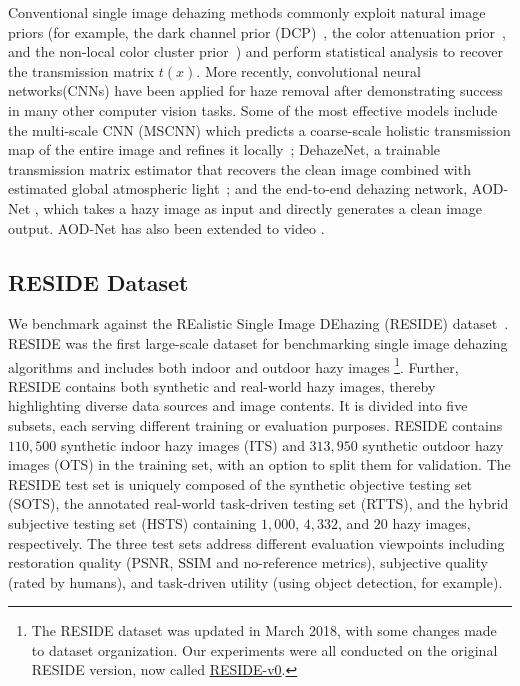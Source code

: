 \documentclass[10pt,twocolumn,letterpaper]{article}
\begin{document}
Conventional single image dehazing methods commonly exploit natural image priors (for example, the dark channel prior (DCP)~\cite{he2011single,tang2014investigating}, the color attenuation prior~\cite{zhu2015fast}, and the non-local color cluster prior~\cite{berman2016non}) and perform statistical analysis to recover the transmission matrix $t(x)$. More recently, convolutional neural networks(CNNs) have been applied for haze removal after demonstrating success in many other computer vision tasks. Some of the most effective models include the multi-scale CNN (MSCNN) which predicts a coarse-scale holistic transmission map of the entire image and refines it locally~\cite{ren2016single}; DehazeNet, a trainable transmission matrix estimator that recovers the clean image combined with estimated global atmospheric light~\cite{cai2016dehazenet}; and the end-to-end dehazing network, AOD-Net \cite{li2017aod,li2017all}, which takes a hazy image as input and directly generates a clean image output. AOD-Net has also been extended to video \cite{li2017end}.

\subsection{RESIDE Dataset}
We benchmark against the REalistic Single Image DEhazing (RESIDE) dataset~\cite{li2017reside}. RESIDE was the first large-scale dataset for benchmarking single image dehazing algorithms and includes both indoor and outdoor hazy images%
\footnote{The RESIDE dataset was updated in March 2018, with some changes made to dataset organization. Our experiments were all conducted on the original RESIDE version, now called \href{https://sites.google.com/view/reside-dehaze-datasets}{RESIDE-v0}.}.
Further, RESIDE contains both synthetic and real-world hazy images, thereby highlighting diverse data sources and image contents. It is divided into five subsets, each serving different training or evaluation purposes. RESIDE contains $110,500$ synthetic indoor hazy images (ITS) and $313,950$ synthetic outdoor hazy images (OTS) in the training set, with an option to split them for validation. The RESIDE test set is uniquely composed of the synthetic objective testing set (SOTS), the annotated real-world task-driven testing set (RTTS), and the hybrid subjective testing set (HSTS) containing $1,000$, $4,332$, and $20$ hazy images, respectively. The three test sets address different evaluation viewpoints including restoration quality (PSNR, SSIM and no-reference metrics), subjective quality (rated by humans), and task-driven utility (using object detection, for example). 
\end{document}
